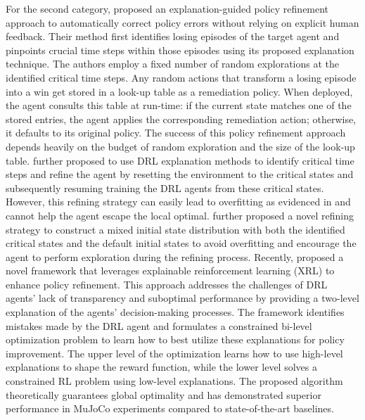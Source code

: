 For the second category, \cite{guo2021edge} proposed an explanation-guided policy refinement approach to automatically correct policy errors without relying on explicit human feedback. Their method first identifies losing episodes of the target agent and pinpoints crucial time steps within those episodes using its proposed explanation technique. The authors employ a fixed number of random explorations at the identified critical time steps. Any random actions that transform a losing episode into a win get stored in a look-up table as a remediation policy.
When deployed, the agent consults this table at run-time: if the current state matches one of the stored entries, the agent applies the corresponding remediation action; otherwise, it defaults to its original policy. The success of this policy refinement approach depends heavily on the budget of random exploration and the size of the look-up table. \cite{cheng2023statemask, yu2023airs} further proposed to use DRL explanation methods to identify critical time steps and refine the agent by resetting the environment to the critical states and subsequently resuming training the DRL agents from these critical states. However, this refining strategy can easily lead to overfitting as evidenced in \cite{chengrice} and cannot help the agent escape the local optimal. 
\cite{chengrice} further proposed a novel refining strategy to construct a mixed initial state distribution with both the identified critical states and the default initial states to avoid overfitting and encourage the agent to perform exploration during the refining process. Recently, \citet{liu2025utilizing} proposed a novel framework that leverages explainable reinforcement learning (XRL) to enhance policy refinement. This approach addresses the challenges of DRL agents' lack of transparency and suboptimal performance by providing a two-level explanation of the agents' decision-making processes. The framework identifies mistakes made by the DRL agent and formulates a constrained bi-level optimization problem to learn how to best utilize these explanations for policy improvement. The upper level of the optimization learns how to use high-level explanations to shape the reward function, while the lower level solves a constrained RL problem using low-level explanations. The proposed algorithm theoretically guarantees global optimality and has demonstrated superior performance in MuJoCo experiments compared to state-of-the-art baselines.